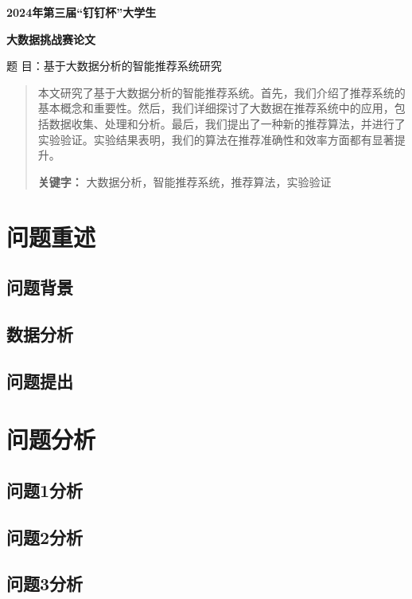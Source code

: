 \documentclass{article}
\begin{document}
  
	
	\begin{center}  
		\fontsize{16pt}{19pt}\selectfont \textbf{2024年第三届“钉钉杯”大学生}  
		
		\fontsize{16pt}{19pt}\selectfont  
		\textbf{大数据挑战赛论文}  
		
		\centering  
		题 目：基于大数据分析的智能推荐系统研究  
	\end{center}  
	
	\begin{abstract}  
		本文研究了基于大数据分析的智能推荐系统。首先，我们介绍了推荐系统的基本概念和重要性。然后，我们详细探讨了大数据在推荐系统中的应用，包括数据收集、处理和分析。最后，我们提出了一种新的推荐算法，并进行了实验验证。实验结果表明，我们的算法在推荐准确性和效率方面都有显著提升。  
		
		\textbf{关键字：} 大数据分析，智能推荐系统，推荐算法，实验验证  
	\end{abstract}  
	\newpage  
	
	\tableofcontents  
	\newpage 
	
	\pagestyle{mainmatter}
	\setcounter{page}{1}
	\section{问题重述}  
	\subsection{问题背景}
	\subsection{数据分析}
	\subsection{问题提出}  
	\section{问题分析}  
	\subsection{问题1分析}
	\subsection{问题2分析}
	\subsection{问题3分析}
\end{document}
